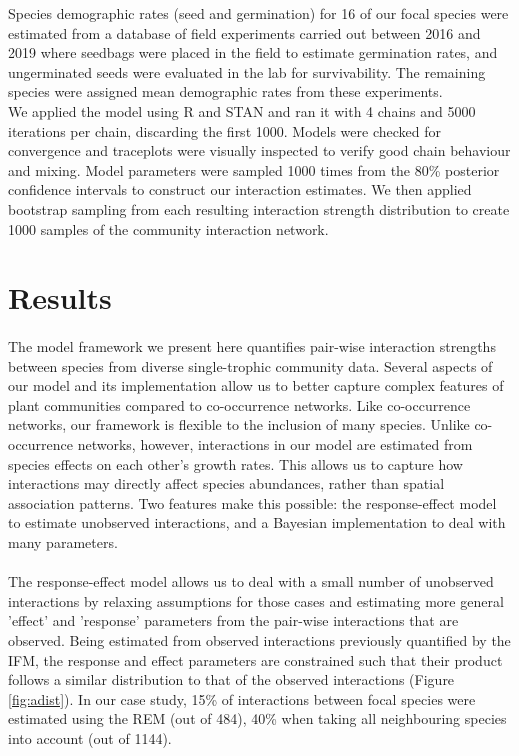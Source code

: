 \documentclass[a4,12pt]{article}
\begin{document}
        Species demographic rates (seed and germination) for 16 of our focal species were estimated from a database of field experiments carried out between 2016 and 2019 where seedbags were placed in the field to estimate germination rates, and ungerminated seeds were evaluated in the lab for survivability. The remaining species were assigned mean demographic rates from these experiments. \\

        We applied the model using R and STAN and ran it with 4 chains and 5000 iterations per chain, discarding the first 1000. Models were checked for convergence and traceplots were visually inspected to verify good chain behaviour and mixing. Model parameters were sampled 1000 times from the 80\% posterior confidence intervals to construct our interaction estimates. We then applied bootstrap sampling from each resulting interaction strength distribution to create 1000 samples of the community interaction network.


\section{Results}

    \paragraph{}
    The model framework we present here quantifies pair-wise interaction strengths between species from diverse single-trophic community data. Several aspects of our model and its implementation allow us to better capture complex features of plant communities compared to co-occurrence networks. Like co-occurrence networks, our framework is flexible to the inclusion of many species. Unlike co-occurrence networks, however, interactions in our model are estimated from species effects on each other's growth rates.  This allows us to capture how interactions may directly affect species abundances, rather than spatial association patterns. Two features make this possible: the response-effect model to estimate unobserved interactions, and a Bayesian implementation to deal with many parameters. 

    \paragraph{}
    The response-effect model allows us to deal with a small number of unobserved interactions by relaxing assumptions for those cases and estimating more general 'effect' and 'response' parameters from the pair-wise interactions that are observed. Being estimated from observed interactions previously quantified by the IFM, the response and effect parameters are constrained such that their product follows a similar distribution to that of the observed interactions (Figure \ref{fig:adist}). In our case study, 15\% of interactions between focal species were estimated using the REM (out of 484), 40\% when taking all neighbouring species into account (out of 1144). 
\end{document}
